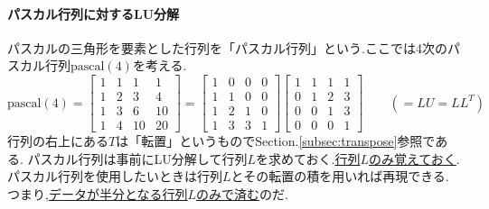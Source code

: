\paragraph{パスカル行列に対するLU分解}
パスカルの三角形を要素とした行列を「パスカル行列」という.ここでは4次のパスカル行列$\mathrm{pascal}(4)$を考える.
\[
    \mathrm{pascal}(4)=\begin{bmatrix}
        1 & 1 & 1 & 1 \\ 1 & 2 & 3 & 4 \\ 1 & 3 & 6 & 10 \\ 1 & 4 & 10 & 20
    \end{bmatrix}=
    \begin{bmatrix}
        1 & 0 & 0 & 0 \\ 1 & 1 & 0 & 0 \\ 1 & 2 & 1 & 0 \\ 1 & 3 & 3 & 1
    \end{bmatrix}
    \begin{bmatrix}
        1 & 1 & 1 & 1 \\ 0 & 1 & 2 & 3 \\ 0 & 0 & 1 & 3 \\ 0 & 0 & 0 & 1
    \end{bmatrix}
    \qquad(=LU = LL^T)
\]
行列の右上にある$T$は「転置」というものでSection.\ref{subsec:transpose}参照である.
パスカル行列は事前にLU分解して行列$L$を求めておく.\underline{行列$L$のみ覚えておく}.パスカル行列を使用したいときは行列$L$とその転置の積を用いれば再現できる.
つまり,\underline{データが半分となる行列$L$のみで済む}のだ.
